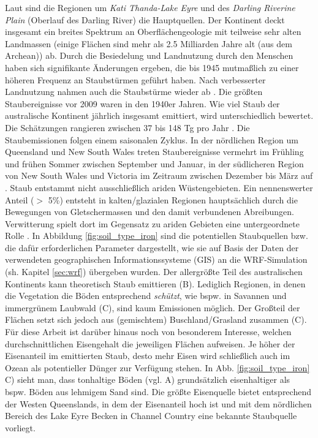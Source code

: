 \documentclass[12pt,a4paper,onecolumn,headheight=30pt]{scrartcl}
\begin{document}
Laut \citet{Deckker.2019} sind die Regionen um \textit{Kati Thanda-Lake Eyre} und des \textit{Darling Riverine Plain} (Oberlauf des Darling River) die Hauptquellen. Der Kontinent deckt insgesamt ein breites Spektrum an Oberflächengeologie mit teilweise sehr alten Landmassen (einige Flächen sind mehr als 2.5 Milliarden Jahre alt (aus dem Archean)) ab. Durch die Besiedelung und Landnutzung durch den Menschen haben sich signifikante Änderungen ergeben, die bis 1945 mutmaßlich zu einer höheren Frequenz an Staubstürmen geführt haben. Nach verbesserter Landnutzung nahmen auch die Staubstürme wieder ab \citep{Deckker.2019}. Die größten Staubereignisse vor 2009 waren in den 1940er Jahren. Wie viel Staub der australische Kontinent jährlich insgesamt emittiert, wird unterschiedlich bewertet. Die Schätzungen rangieren zwischen 37 bis 148 Tg pro Jahr \citep{Shao.2011}. Die Staubemissionen folgen einem saisonalen Zyklus. In der nördlichen Region um Queensland und New South Wales treten Staubereignisse vermehrt im Frühling und frühen Sommer zwischen September und Januar, in der südlicheren Region von New South Wales und Victoria im Zeitraum zwischen Dezember bis März auf \citep{Deckker.2019}. Staub entstammt nicht ausschließlich ariden Wüstengebieten. Ein nennenswerter Anteil ($>$ 5\%) entsteht in kalten/glazialen Regionen hauptsächlich durch die Bewegungen von Gletschermassen und den damit verbundenen Abreibungen. Verwitterung spielt dort im Gegensatz zu ariden Gebieten eine untergeordnete Rolle \citep{Marx.2018}. In Abbildung \ref{fig:soil_type_iron} sind die potentiellen Staubquellen bzw. die dafür erforderlichen Parameter dargestellt, wie sie auf Basis der Daten der verwendeten geographischen Informationssysteme (GIS) an die WRF-Simulation (sh. Kapitel \ref{sec:wrf}) übergeben wurden. Der allergrößte Teil des australischen Kontinents kann theoretisch Staub emittieren (B). Lediglich Regionen, in denen die Vegetation die Böden entsprechend \textit{schützt}, wie bspw. in Savannen und immergrünem Laubwald (C), sind kaum Emissionen möglich. Der Großteil der Flächen setzt sich jedoch aus (gemischtem) Buschland/Grasland zusammen (C). Für diese Arbeit ist darüber hinaus noch von besonderem Interesse, welchen durchschnittlichen Eisengehalt die jeweiligen Flächen aufweisen. Je höher der Eisenanteil im emittierten Staub, desto mehr Eisen wird schließlich auch im Ozean als potentieller Dünger zur Verfügung stehen. In Abb. \ref{fig:soil_type_iron} C) sieht man, dass tonhaltige Böden (vgl. A) grundsätzlich eisenhaltiger als bspw. Böden aus lehmigem Sand sind. Die größte Eisenquelle bietet entsprechend der Westen Queenslands, in dem der Eisenanteil hoch ist und mit dem nördlichen Bereich des Lake Eyre Becken in Channel Country eine bekannte Staubquelle vorliegt.
\end{document}
